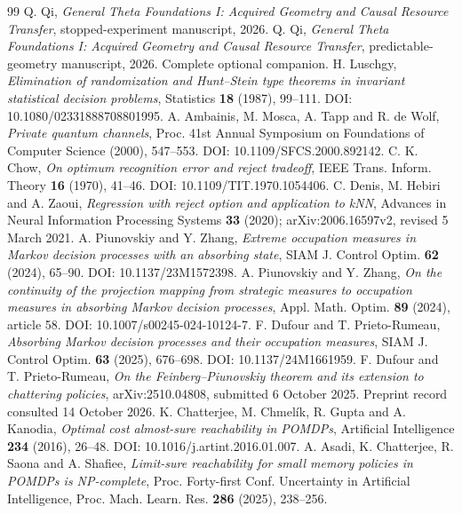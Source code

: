 \begin{thebibliography}{99}
 Q. Qi, \emph{General Theta Foundations I: Acquired Geometry and Causal Resource Transfer}, stopped-experiment manuscript, 2026.
 Q. Qi, \emph{General Theta Foundations I: Acquired Geometry and Causal Resource Transfer}, predictable-geometry manuscript, 2026. Complete optional companion.
 H. Luschgy, \emph{Elimination of randomization and Hunt--Stein type theorems in invariant statistical decision problems}, Statistics \textbf{18} (1987), 99--111. DOI: 10.1080/02331888708801995.
 A. Ambainis, M. Mosca, A. Tapp and R. de Wolf, \emph{Private quantum channels}, Proc. 41st Annual Symposium on Foundations of Computer Science (2000), 547--553. DOI: 10.1109/SFCS.2000.892142.
 C. K. Chow, \emph{On optimum recognition error and reject tradeoff}, IEEE Trans. Inform. Theory \textbf{16} (1970), 41--46. DOI: 10.1109/TIT.1970.1054406.
 C. Denis, M. Hebiri and A. Zaoui, \emph{Regression with reject option and application to kNN}, Advances in Neural Information Processing Systems \textbf{33} (2020); arXiv:2006.16597v2, revised 5 March 2021.
 A. Piunovskiy and Y. Zhang, \emph{Extreme occupation measures in Markov decision processes with an absorbing state}, SIAM J. Control Optim. \textbf{62} (2024), 65--90. DOI: 10.1137/23M1572398.
 A. Piunovskiy and Y. Zhang, \emph{On the continuity of the projection mapping from strategic measures to occupation measures in absorbing Markov decision processes}, Appl. Math. Optim. \textbf{89} (2024), article 58. DOI: 10.1007/s00245-024-10124-7.
 F. Dufour and T. Prieto-Rumeau, \emph{Absorbing Markov decision processes and their occupation measures}, SIAM J. Control Optim. \textbf{63} (2025), 676--698. DOI: 10.1137/24M1661959.
 F. Dufour and T. Prieto-Rumeau, \emph{On the Feinberg--Piunovskiy theorem and its extension to chattering policies}, arXiv:2510.04808, submitted 6 October 2025. Preprint record consulted 14 October 2026.
 K. Chatterjee, M. Chmel\'ik, R. Gupta and A. Kanodia, \emph{Optimal cost almost-sure reachability in POMDPs}, Artificial Intelligence \textbf{234} (2016), 26--48. DOI: 10.1016/j.artint.2016.01.007.
 A. Asadi, K. Chatterjee, R. Saona and A. Shafiee, \emph{Limit-sure reachability for small memory policies in POMDPs is NP-complete}, Proc. Forty-first Conf. Uncertainty in Artificial Intelligence, Proc. Mach. Learn. Res. \textbf{286} (2025), 238--256.
\end{thebibliography}
